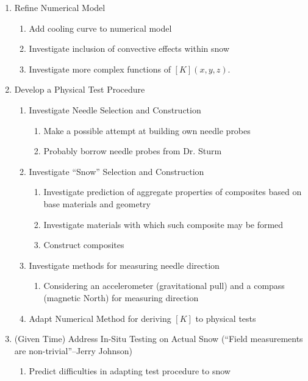 \documentclass[10pt, letterpaper]{article}
\begin{document}
\begin{enumerate}
        \item Refine Numerical Model
        \begin{enumerate}
            \item Add cooling curve to numerical model
            \item Investigate inclusion of convective effects within snow
            \item Investigate more complex functions of \([K](x,y,z)\).
        \end{enumerate}
        \item Develop a Physical Test Procedure
        \begin{enumerate}
            \item Investigate Needle Selection and Construction
            \begin{enumerate}
                \item Make a possible attempt at building own needle probes
                \item Probably borrow needle probes from Dr. Sturm
            \end{enumerate}
            \item Investigate ``Snow'' Selection and Construction
            \begin{enumerate}
                \item Investigate prediction of aggregate properties of composites based on base materials and geometry
                \item Investigate materials with which such composite may be formed
                \item Construct composites
            \end{enumerate}
            \item Investigate methods for measuring needle direction
            \begin{enumerate}
                \item Considering an accelerometer (gravitational pull) and a compass (magnetic North) for measuring direction
            \end{enumerate}
            \item Adapt Numerical Method for deriving \([K]\) to physical tests
        \end{enumerate}
        \item (Given Time) Address In-Situ Testing on Actual Snow (``Field measurements are non-trivial''--Jerry Johnson)
        \begin{enumerate}
            \item Predict difficulties in adapting test procedure to snow

\end{enumerate}
\end{enumerate}
\end{document}
